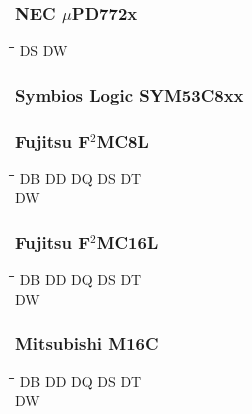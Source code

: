 \subsubsection{NEC $\mu$PD772x}
{\tt\begin{tabbing} 
\hspace{3cm}\=\hspace{3cm}\=\hspace{3cm}\=\hspace{3cm}\=\kill
DS         \> DW \\
\end{tabbing}}

\subsubsection{Symbios Logic SYM53C8xx}
{\tt\begin{tabbing} 
\end{tabbing}}

\subsubsection{Fujitsu F$^{2}$MC8L}
{\tt\begin{tabbing} 
\hspace{3cm}\=\hspace{3cm}\=\hspace{3cm}\=\hspace{3cm}\=\kill
DB         \> DD          \> DQ          \> DS          \> DT \\
DW \\
\end{tabbing}}

\subsubsection{Fujitsu F$^{2}$MC16L}
{\tt\begin{tabbing} 
\hspace{3cm}\=\hspace{3cm}\=\hspace{3cm}\=\hspace{3cm}\=\kill
DB         \> DD          \> DQ          \> DS          \> DT \\
DW \\
\end{tabbing}}

\subsubsection{Mitsubishi M16C}
{\tt\begin{tabbing}
\hspace{3cm}\=\hspace{3cm}\=\hspace{3cm}\=\hspace{3cm}\=\kill
DB         \> DD          \> DQ          \> DS          \> DT \\
DW \\
\end{tabbing}}
